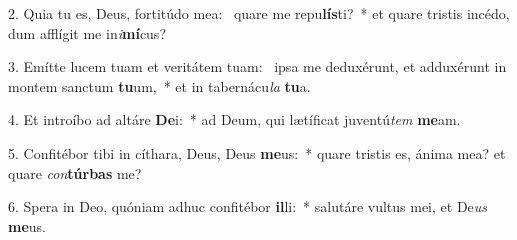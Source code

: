 2. Quia tu es, Deus, fortitúdo mea: \dag\  quare me repu\textbf{lís}ti?~*  et quare tristis incédo, dum afflígit me in\textit{i}\textbf{mí}cus?\

3. Emítte lucem tuam et veritátem tuam: \dag\  ipsa me deduxérunt, et adduxérunt in montem sanctum \textbf{tu}um,~*  et in tabernácu\textit{la} \textbf{tu}a.\

4. Et introíbo ad altáre \textbf{De}i:~*  ad Deum, qui lætíficat juventú\textit{tem} \textbf{me}am.\

5. Confitébor tibi in cíthara, Deus, Deus \textbf{me}us:~*  quare tristis es, ánima mea? et quare \textit{con}\textbf{túr}\textbf{bas} me?\

6. Spera in Deo, quóniam adhuc confitébor \textbf{il}li:~*  salutáre vultus mei, et De\textit{us} \textbf{me}us.\

